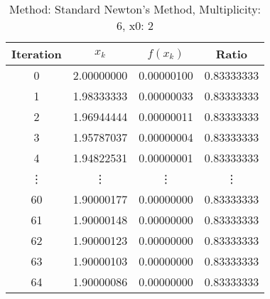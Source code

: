 \begin{table}
\centering
\caption{Method: Standard Newton's Method, Multiplicity: 6, x0: 2}
\label{tab:table_Standard_Newton's_Method_6_2}
\begin{tabular}{c c c c}
\toprule
Iteration &      $x_k$ &   $f(x_k)$ &      Ratio \\
\midrule
        0 & 2.00000000 & 0.00000100 & 0.83333333 \\
        1 & 1.98333333 & 0.00000033 & 0.83333333 \\
        2 & 1.96944444 & 0.00000011 & 0.83333333 \\
        3 & 1.95787037 & 0.00000004 & 0.83333333 \\
        4 & 1.94822531 & 0.00000001 & 0.83333333 \\
   \vdots &     \vdots &     \vdots &     \vdots \\
       60 & 1.90000177 & 0.00000000 & 0.83333333 \\
       61 & 1.90000148 & 0.00000000 & 0.83333333 \\
       62 & 1.90000123 & 0.00000000 & 0.83333333 \\
       63 & 1.90000103 & 0.00000000 & 0.83333333 \\
       64 & 1.90000086 & 0.00000000 & 0.83333333 \\
\bottomrule
\end{tabular}
\end{table}
